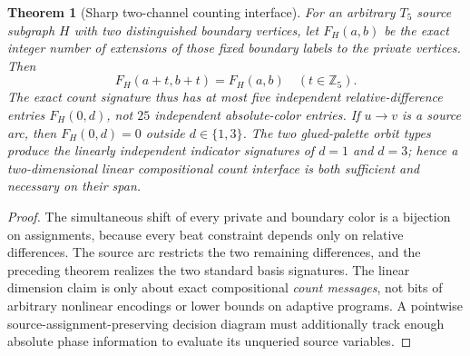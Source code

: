 \documentclass[11pt]{article}
\newtheorem{theorem}{Theorem}
\begin{document}
\begin{theorem}[Sharp two-channel counting interface]
For an arbitrary $T_5$ source subgraph $H$ with two distinguished
boundary vertices, let $F_H(a,b)$ be the exact integer number of
extensions of those fixed boundary labels to the private vertices.
Then
\[
 F_H(a+t,b+t)=F_H(a,b)\quad(t\in\mathbb Z_5).
\]
The exact count signature thus has at most five independent
relative-difference entries $F_H(0,d)$, not $25$ independent
absolute-color entries. If $u\to v$ is a source arc, then
$F_H(0,d)=0$ outside $d\in\{1,3\}$.
The two glued-palette orbit types produce the linearly independent
indicator signatures of $d=1$ and $d=3$; hence a two-dimensional
linear compositional count interface is both sufficient and
necessary on their span.
\end{theorem}
\begin{proof}
The simultaneous shift of every private and boundary color
is a bijection on assignments, because every beat constraint
depends only on relative differences. The source arc restricts
the two remaining differences, and the preceding theorem
realizes the two standard basis signatures. The linear dimension
claim is only about exact compositional \emph{count messages},
not bits of arbitrary nonlinear encodings or lower bounds on
adaptive programs. A pointwise source-assignment-preserving
decision diagram must additionally track enough absolute phase
information to evaluate its unqueried source variables.
\end{proof}
\end{document}
